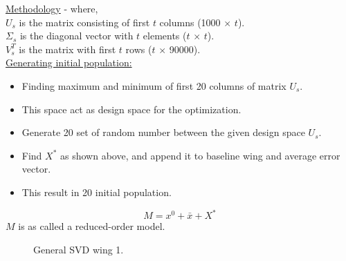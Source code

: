 \begin{frame}[allowframebreaks]{\underline{Methodology} -}
where,\\
$U_s$ is the matrix consisting of first $t$ columns (1000 $\times$ $t$).\\
$\Sigma_s$ is the diagonal vector with $t$ elements ($t$ $\times$ $t$).\\
$V^T_s$ is the matrix with first $t$ rows ($t$ $\times$ 90000).\\[1mm]

\underline{Generating initial population:}
\begin{itemize}
    \item Finding maximum and minimum of first 20 columns of matrix $U_s$.
    \item This space act as design space for the optimization.
    \item Generate 20 set of random number between the given design space $U_s$.
    \item Find $X^*$ as shown above, and append it to baseline wing and average error vector.
    \item This result in 20 initial population.
\end{itemize}
$$ M = x^0 + \bar{x} + X^* $$
$M$ is as called a reduced-order model.
\newpage
\parbox{0.43\linewidth}{
\begin{figure}
    \centering
    \caption{General SVD wing 1.}
    \label{svd_wing_1}
\end{figure}
}
\parbox{0.43\linewidth}{
\begin{figure}
    \centering

\end{figure}}
\end{frame}
